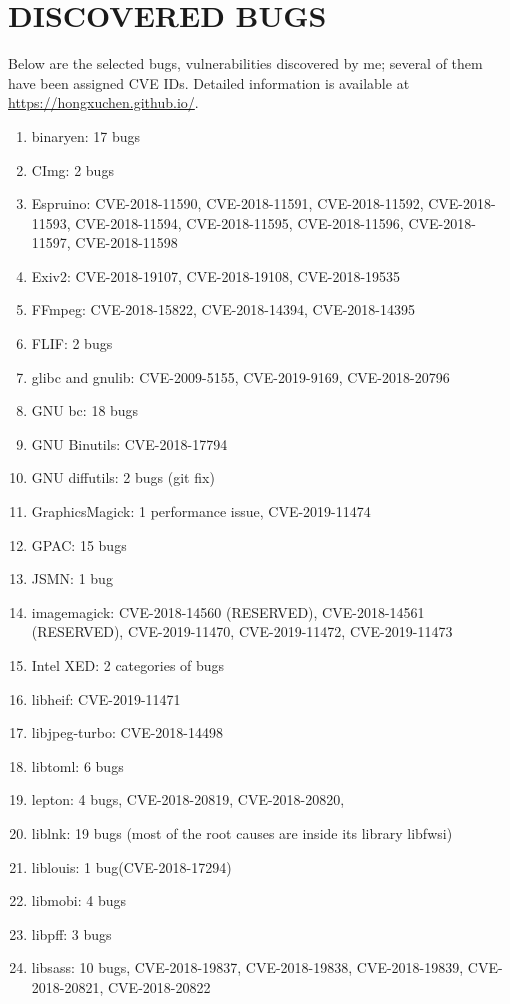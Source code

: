 \documentclass[paper=a4,fontsize=11pt]{article} %
\newcommand{\NewPart}[1]{\section*{\uppercase{#1}}}
\begin{document}
\NewPart{Discovered Bugs}
Below are the selected bugs, vulnerabilities discovered by me; several of them have been assigned CVE IDs. Detailed information is available at \url{https://hongxuchen.github.io/}.
\begin{enumerate}
    \item binaryen: 17 bugs
    \item CImg: 2 bugs
    \item Espruino: CVE-2018-11590, CVE-2018-11591, CVE-2018-11592, CVE-2018-11593, CVE-2018-11594, CVE-2018-11595, CVE-2018-11596, CVE-2018-11597, CVE-2018-11598
    \item Exiv2: CVE-2018-19107, CVE-2018-19108, CVE-2018-19535
    \item FFmpeg: CVE-2018-15822, CVE-2018-14394, CVE-2018-14395
    \item FLIF: 2 bugs
    \item glibc and gnulib: CVE-2009-5155, CVE-2019-9169, CVE-2018-20796
    \item GNU bc: 18 bugs
    \item GNU Binutils: CVE-2018-17794
    \item GNU diffutils: 2 bugs (git fix)
    \item GraphicsMagick: 1 performance issue, CVE-2019-11474
    \item GPAC: 15 bugs
    \item JSMN: 1 bug
    \item imagemagick: CVE-2018-14560 (RESERVED), CVE-2018-14561 (RESERVED), CVE-2019-11470, CVE-2019-11472, CVE-2019-11473
    \item Intel XED: 2 categories of bugs
    \item libheif: CVE-2019-11471
    \item libjpeg-turbo: CVE-2018-14498
    \item libtoml: 6 bugs
    \item lepton: 4 bugs, CVE-2018-20819, CVE-2018-20820,
    \item liblnk: 19 bugs (most of the root causes are inside its library libfwsi)
    \item liblouis: 1 bug(CVE-2018-17294)
    \item libmobi: 4 bugs
    \item libpff: 3 bugs
    \item libsass: 10 bugs, CVE-2018-19837, CVE-2018-19838, CVE-2018-19839, CVE-2018-20821, CVE-2018-20822

\end{enumerate}
\end{document}
